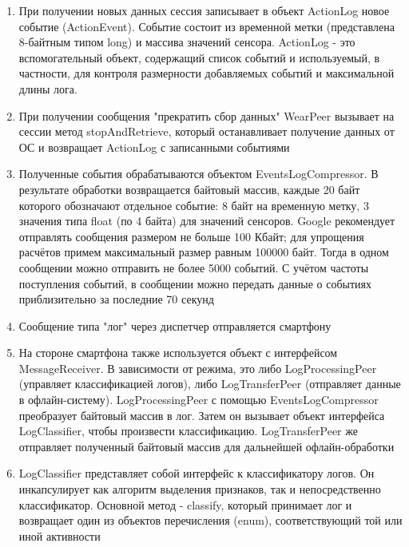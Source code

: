 \begin{enumerate}
\item При получении новых данных сессия записывает в объект ActionLog новое событие (ActionEvent). Событие состоит из временной метки (представлена 8-байтным типом long) и массива значений сенсора. ActionLog - это вспомогательный объект, содержащий список событий и используемый, в частности, для контроля размерности добавляемых событий и максимальной длины лога.
\item При получении сообщения "прекратить сбор данных" WearPeer вызывает на сессии метод stopAndRetrieve, который останавливает получение данных от ОС и возвращает ActionLog с записанными событиями
\item Полученные события обрабатываются объектом EventsLogCompressor. В результате обработки возвращается байтовый массив, каждые 20 байт которого обозначают отдельное событие: 8 байт на временную метку, 3 значения типа float (по 4 байта) для значений сенсоров. Google рекомендует отправлять сообщения размером не больше 100 Кбайт; для упрощения расчётов примем максимальный размер равным 100000 байт. Тогда в одном сообщении можно отправить не более 5000 событий. С учётом частоты поступления событий, в сообщении можно передать данные о событиях приблизительно за последние 70 секунд
\item Сообщение типа "лог" через диспетчер отправляется смартфону
\item На стороне смартфона также используется объект с интерфейсом MessageReceiver. В зависимости от режима, это либо LogProcessingPeer (управляет классификацией логов), либо LogTransferPeer (отправляет данные в офлайн-систему). LogProcessingPeer с помощью EventsLogCompressor преобразует байтовый массив в лог. Затем он вызывает объект интерфейса LogClassifier, чтобы произвести классификацию. LogTransferPeer же отправляет полученный байтовый массив для дальнейшей офлайн-обработки
\item LogClassifier представляет собой интерфейс к классификатору логов. Он инкапсулирует как алгоритм выделения признаков, так и непосредственно классификатор. Основной метод - classify, который принимает лог и возвращает один из объектов перечисления (enum), соответствующий той или иной активности
\end{enumerate}


